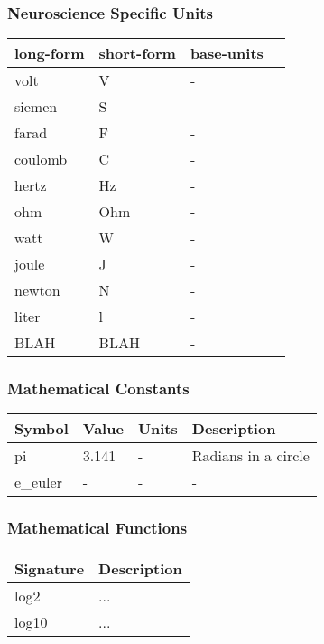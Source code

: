 \documentclass{article}
\begin{document}
\subsubsection{Neuroscience Specific Units}

\begin{center}
    \begin{tabular}{ | l | l |  l | p{5cm} |}
    \hline
    long-form & short-form & base-units  \\ \hline
    volt & V & - \\ \hline
    siemen & S & - \\ \hline
    farad & F & - \\ \hline
    coulomb & C & - \\ \hline
    hertz & Hz & - \\ \hline
    ohm & Ohm & - \\ \hline
    watt & W & - \\ \hline
    joule & J & - \\ \hline
    newton & N & - \\ \hline
    liter & l & - \\ \hline
    BLAH & BLAH & - \\ \hline
    \end{tabular}
\end{center}


\subsubsection{Mathematical Constants}
\begin{center}
    \begin{tabular}{ | l | l |  l | p{5cm} |}
    \hline
    Symbol & Value & Units & Description  \\ \hline
    pi & 3.141 & - & Radians in a circle \\ \hline
    e\_euler & - & - & - \\ \hline
    \end{tabular}
\end{center}

\subsubsection{Mathematical Functions}
\begin{center}
    \begin{tabular}{ | l |  p{5cm} |}
    \hline
    Signature &  Description  \\ \hline
    log2 & {...} \\ \hline
    log10 & {...} \\ \hline
    \end{tabular}
\end{center}
\end{document}
